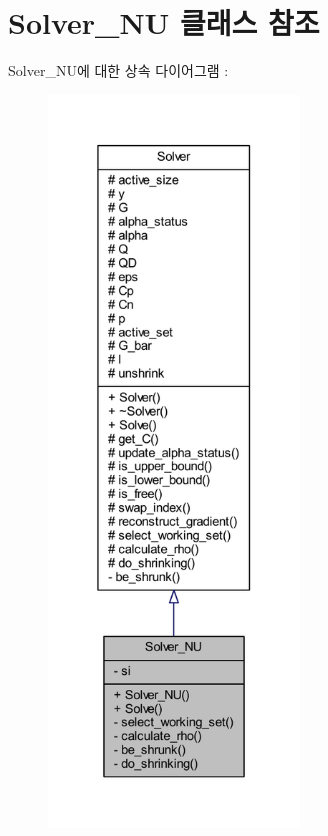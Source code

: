 \hypertarget{class_solver___n_u}{\section{Solver\+\_\+\+N\+U 클래스 참조}
\label{class_solver___n_u}
}


Solver\+\_\+\+N\+U에 대한 상속 다이어그램 \+: 
\nopagebreak
\begin{figure}[H]
\begin{center}
\leavevmode
\includegraphics[height=550pt]{class_solver___n_u__inherit__graph}
\end{center}
\end{figure}


